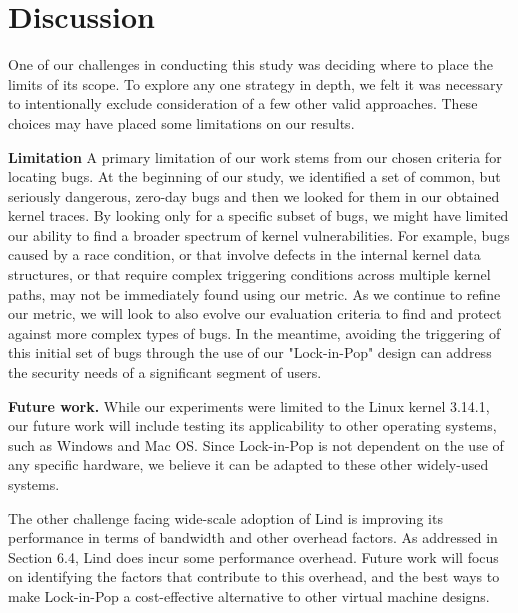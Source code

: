 \section{Discussion}
\label{sec.limitation}

One of our challenges in conducting this study was deciding where to place the
limits of its scope.  To explore any one strategy
in depth, we felt it was necessary to intentionally exclude consideration of
a few other valid approaches. These choices may have placed some limitations on our results.

\textbf{Limitation }
A primary limitation of our work stems from our chosen criteria for locating
bugs. At the beginning
of our study, we identified a set of common, but seriously dangerous, zero-day bugs
and then we looked for them in our obtained kernel traces. By looking only
for a specific subset of bugs, we might have limited our
ability to find a broader spectrum of kernel vulnerabilities. For example, bugs
caused by a race condition, or that involve defects in the internal kernel data
structures, or that require complex triggering conditions across multiple kernel
paths, may not be immediately found using our metric. As we continue to refine
our metric, we will look to also evolve our evaluation
criteria to find and protect against more complex types of bugs.
In the meantime, avoiding the triggering of this initial set of bugs
through the use of our "Lock-in-Pop" design can address the security
needs of a significant segment of users.

\textbf{Future work.}
While our experiments were limited to the Linux kernel 3.14.1, our future work
will include testing its applicability to other operating systems, such as
Windows and Mac OS. Since Lock-in-Pop is not dependent on the use of any
specific hardware, we believe it can be adapted to these other
widely-used systems.

The other challenge facing wide-scale adoption of Lind is improving its
performance in terms of bandwidth and other overhead factors. As addressed in
Section 6.4, Lind does incur some performance overhead. Future work will focus on identifying
the factors that contribute to this overhead, and the best ways to make Lock-in-Pop
a cost-effective alternative to other virtual machine designs.
